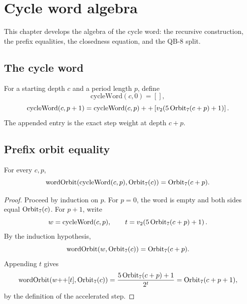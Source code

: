 \section{Cycle word algebra}

This chapter develops the algebra of the cycle word: the recursive
construction, the prefix equalities, the closedness equation, and the
QB-8 split.

\subsection{The cycle word}

For a starting depth $c$ and a period length $p$, define
\begin{equation*}
  \mathrm{cycleWord}(c,0)=[],
\end{equation*}
\begin{equation*}
  \mathrm{cycleWord}(c,p+1)
    =\mathrm{cycleWord}(c,p)
    ++ \left[v_2\!\left(5\,\mathrm{Orbit}_7(c+p)+1\right)\right].
\end{equation*}
The appended entry is the exact step weight at depth $c+p$.

\subsection{Prefix orbit equality}

\begin{lemma}
For every $c,p$,
\begin{equation*}
  \mathrm{wordOrbit}(\mathrm{cycleWord}(c,p),\mathrm{Orbit}_7(c))
    =\mathrm{Orbit}_7(c+p).
\end{equation*}
\end{lemma}

\begin{proof}
Proceed by induction on $p$.  For $p=0$, the word is empty and both
sides equal $\mathrm{Orbit}_7(c)$.  For $p+1$, write
\begin{equation*}
  w=\mathrm{cycleWord}(c,p),
  \qquad
  t=v_2\!\left(5\,\mathrm{Orbit}_7(c+p)+1\right).
\end{equation*}
By the induction hypothesis,
\begin{equation*}
  \mathrm{wordOrbit}(w,\mathrm{Orbit}_7(c))=\mathrm{Orbit}_7(c+p).
\end{equation*}
Appending $t$ gives
\begin{equation*}
  \mathrm{wordOrbit}(w{++}[t],\mathrm{Orbit}_7(c))
    =\frac{5\,\mathrm{Orbit}_7(c+p)+1}{2^t}
    =\mathrm{Orbit}_7(c+p+1),
\end{equation*}
by the definition of the accelerated step.
\end{proof}

